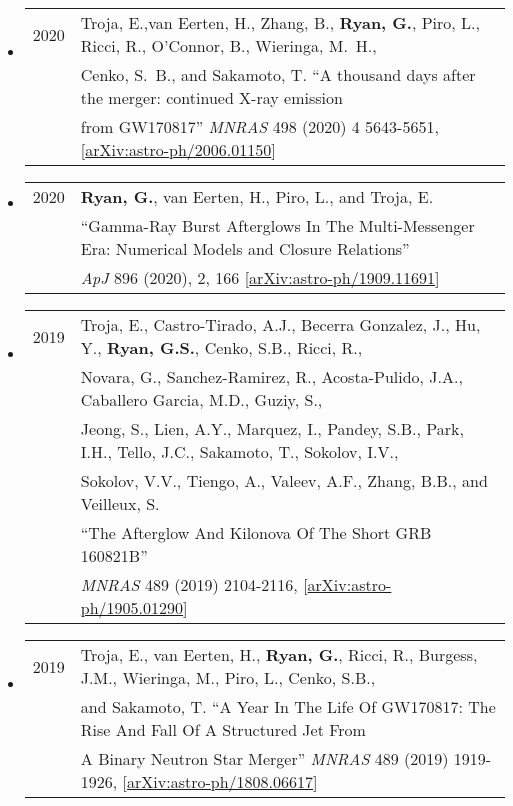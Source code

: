 \begin{itemize}
\item \begin{tabular}{ll}
2020 & {Troja}, E.,{van Eerten}, H., {Zhang}, B., {\bf {Ryan}, G.}, {Piro}, L., {Ricci}, R., {O'Connor}, B., {Wieringa}, M.~H.,\\
	&  {Cenko}, S.~B., and {Sakamoto}, T.  ``A thousand days after the merger: continued X-ray emission\\
	&  from GW170817''  \emph{MNRAS} 498 (2020) 4 5643-5651, [\href{https://arxiv.org/abs/2006.01150}{arXiv:astro-ph/2006.01150}]
\end{tabular}

\item \begin{tabular}{ll}
2020 & {\bf {Ryan}, G.}, {van Eerten}, H., {Piro}, L., and {Troja}, E. \\
	& ``Gamma-Ray Burst Afterglows In The Multi-Messenger Era: Numerical Models and Closure Relations'' \\
	& \emph{ApJ} 896 (2020), 2, 166 [\href{https://arxiv.org/abs/1909.11691}{arXiv:astro-ph/1909.11691}]
\end{tabular}

\item \begin{tabular}{ll}
2019 & {Troja}, E., {Castro-Tirado}, A.J.,  {Becerra Gonzalez}, J.,
         {Hu}, Y., {\bf {Ryan}, G.S.}, {Cenko}, S.B., {Ricci}, R., \\ &
         {Novara}, G., {Sanchez-Ramirez}, R., {Acosta-Pulido}, J.A.,
         {Caballero Garcia}, M.D., {Guziy}, S.,  \\ &
         {Jeong}, S.,
         {Lien}, A.Y., {Marquez}, I., {Pandey}, S.B., {Park}, I.H.,
         {Tello}, J.C., {Sakamoto}, T., {Sokolov}, I.V., \\ &
         {Sokolov}, V.V., {Tiengo}, A., {Valeev}, A.F.,
         {Zhang}, B.B., and {Veilleux}, S. \\ &``The Afterglow And Kilonova Of The Short GRB 160821B'' \\ &
         \emph{MNRAS} 489 (2019) 2104-2116, [\href{https://arxiv.org/abs/1905.01290}{arXiv:astro-ph/1905.01290}]
\end{tabular}

\item \begin{tabular}{ll}
2019 & Troja, E., van Eerten, H., {\bf Ryan, G.}, Ricci, R., Burgess, J.M., Wieringa, M., Piro, L., Cenko, S.B.,\\
	& and Sakamoto, T. ``A Year In The Life Of GW170817: The Rise And Fall Of A Structured Jet From\\
	&  A Binary Neutron Star Merger'' \emph{MNRAS} 489 (2019) 1919-1926, [\href{https://arxiv.org/abs/1808.06617}{arXiv:astro-ph/1808.06617}]
\end{tabular}


\end{itemize}
